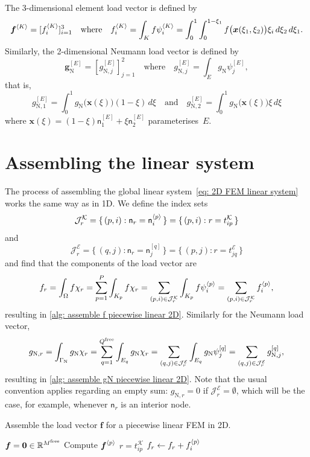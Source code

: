 The 3-dimensional element load vector is defined by
\[
\boldsymbol{f}^{\langle K\rangle}=[f^{\langle K\rangle}_i]_{i=1}^3
\quad\text{where}\quad
f^{\langle K\rangle}_i=\int_K f\psi^{\langle K\rangle}_i
	=\int_0^1\int_0^{1-\xi_1}f\bigl(\boldsymbol{x}(\xi_1,\xi_2)\bigr)\xi_i
	\,d\xi_2 \,d\xi_1.
\]
Similarly, the 2-dimensional Neumann load vector is defined by
\[
\boldsymbol{g}^{[E]}_{\mathrm{N}}=[g^{[E]}_{\mathrm{N},j}]_{j=1}^2
\quad\text{where}\quad
g^{[E]}_{\mathrm{N},j}=\int_E g_{\mathrm{N}}\psi^{[E]}_j,
\]
that is,
\[
g^{[E]}_{\mathrm{N},1}
    =\int_0^1g_{\mathrm{N}}\bigl(\boldsymbol{x}(\xi)\bigr)(1-\xi)\,d\xi
\quad\text{and}\quad
g^{[E]}_{\mathrm{N},2}
    =\int_0^1g_{\mathrm{N}}\bigl(\boldsymbol{x}(\xi)\bigr)\xi\,d\xi
\]
where $\boldsymbol{x}(\xi)=(1-\xi)\mathsf{n}^{[E]}_1+\xi\mathsf{n}^{[E]}_2$
parameterises~$E$.


\section{Assembling the linear system}

The process of assembling the global linear
system~\eqref{eq: 2D FEM linear system} works the same way as in 1D.  We
define the index sets
\[
\mathcal{J}^{\mathcal{K}}_r=\{\,(p,i):\mathsf{n}_r=\mathsf{n}^{\langle p\rangle}_i\,\}
    =\{\,(p,i):r=t^{\mathcal{K}}_{ip}\,\}
\]
and
\[
\mathcal{J}^{\mathcal{E}}_r=\{\,(q,j):\mathsf{n}_r=\mathsf{n}^{[q]}_j\,\}
    =\{\,(p,j):r=t^{\mathcal{E}}_{jq}\,\}
\]
and find that the components of the load vector are
\[
f_r=\int_\Omega f\chi_r=\sum_{p=1}^P\int_{K_p}f\chi_r
    =\sum_{(p,i)\in\mathcal{J}^{\mathcal{K}}_r}\int_{K_p}f\psi^{\langle p\rangle}_i
    =\sum_{(p,i)\in\mathcal{J}^{\mathcal{K}}_r}f^{\langle p\rangle}_i,
\]
resulting in \cref{alg: assemble f piecewise linear 2D}. Similarly for the
Neumann load vector,
\[
g_{\mathrm{N},r}=\int_{\Gamma_{\mathrm{N}}}g_{\mathrm{N}}\chi_r
    =\sum_{q=1}^{Q^{\mathrm{free}}}\int_{E_q}g_{\mathrm{N}}\chi_r
    =\sum_{(q,j)\in\mathcal{J}^{\mathcal{E}}_r}
        \int_{E_q}g_{\mathrm{N}}\psi^{[q]}_j
    =\sum_{(q,j)\in\mathcal{J}^{\mathcal{E}}_r}g_{\mathrm{N},j}^{[q]},
\]
resulting in \cref{alg: assemble gN piecewise linear 2D}.  Note that
the usual convention applies regarding an empty sum: $g_{\mathrm{N},r}=0$ if
$\mathcal{J}^{\mathcal{E}}_r=\emptyset$, which will be the case, for example,
whenever $\mathsf{n}_r$ is an interior node.

\begin{algorithm}
\caption{Assemble the load vector $\boldsymbol{f}$ for a piecewise linear FEM in
2D.}\label{alg: assemble f piecewise linear 2D}
\begin{algorithmic}
\State $\boldsymbol{f}=\boldsymbol{0}\in\mathbb{R}^{M^{\mathrm{free}}}$
    \State Compute $\boldsymbol{f}^{\langle p\rangle}$
        \State $r=t^{\mathcal{K}}_{ip}$
            \State $f_r\gets f_r+f^{\langle p\rangle}_i$
        \EndIf
    \EndFor
\EndFor
\end{algorithmic}
\end{algorithm}

